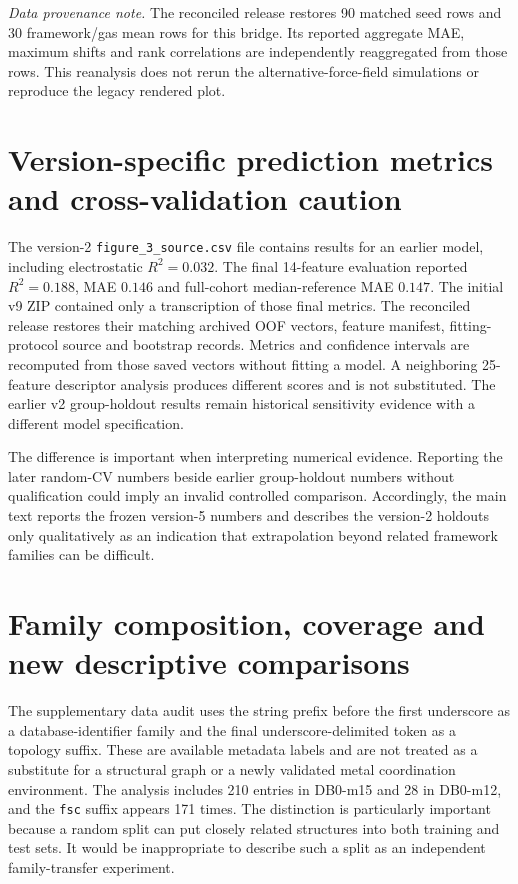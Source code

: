 \documentclass[11pt,a4paper]{article}
\begin{document}
\noindent\textit{Data provenance note.} The reconciled release restores 90 matched seed rows and 30 framework/gas mean rows for this bridge. Its reported aggregate MAE, maximum shifts and rank correlations are independently reaggregated from those rows. This reanalysis does not rerun the alternative-force-field simulations or reproduce the legacy rendered plot.

\section{Version-specific prediction metrics and cross-validation caution}

The version-2 \texttt{figure\_3\_source.csv} file contains results for an earlier model, including electrostatic $R^2=0.032$. The final 14-feature evaluation reported $R^2=0.188$, MAE $0.146$ and full-cohort median-reference MAE $0.147$. The initial v9 ZIP contained only a transcription of those final metrics. The reconciled release restores their matching archived OOF vectors, feature manifest, fitting-protocol source and bootstrap records. Metrics and confidence intervals are recomputed from those saved vectors without fitting a model. A neighboring 25-feature descriptor analysis produces different scores and is not substituted. The earlier v2 group-holdout results remain historical sensitivity evidence with a different model specification.

The difference is important when interpreting numerical evidence. Reporting the later random-CV numbers beside earlier group-holdout numbers without qualification could imply an invalid controlled comparison. Accordingly, the main text reports the frozen version-5 numbers and describes the version-2 holdouts only qualitatively as an indication that extrapolation beyond related framework families can be difficult.


\section{Family composition, coverage and new descriptive comparisons}

The supplementary data audit uses the string prefix before the first underscore as a database-identifier family and the final underscore-delimited token as a topology suffix. These are available metadata labels and are not treated as a substitute for a structural graph or a newly validated metal coordination environment. The analysis includes 210 entries in DB0-m15 and 28 in DB0-m12, and the \texttt{fsc} suffix appears 171 times. The distinction is particularly important because a random split can put closely related structures into both training and test sets. It would be inappropriate to describe such a split as an independent family-transfer experiment.
\end{document}
